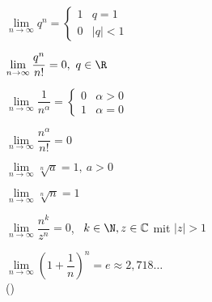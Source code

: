 \begin{multicols}{2}
\begin{description}
    \item $\lim\limits_{n \to \infty} q^n = \begin{cases}
        1 & q = 1 \\
        0 & |q| < 1
        \end{cases}$
    \item $\lim\limits_{n \to \infty} \dfrac{q^n}{n!} = 0, \ q \in \R$
    \item $\lim\limits_{n \to \infty} \dfrac{1}{n^\alpha} = \begin{cases}
        0 & \alpha > 0 \\
        1 & \alpha = 0
        \end{cases}$
    \item $\lim\limits_{n \to \infty} \dfrac{n^\alpha}{n!} = 0$
    \item $\lim\limits_{n \to \infty} \sqrt[n]{a} = 1, \ a > 0$
    \item $\lim\limits_{n \to \infty} \sqrt[n]{n} = 1$
    \item $\lim\limits_{n \to \infty} \dfrac{n^k}{z^n} = 0$, \ $k \in \N, z \in \mathbb{C}$ mit $|z| > 1$
    \item $\lim\limits_{n \to \infty} \left(1+\dfrac{1}{n}\right)^n = e \approx 2,718\dots$ \\ ()
\end{description}
\end{multicols}